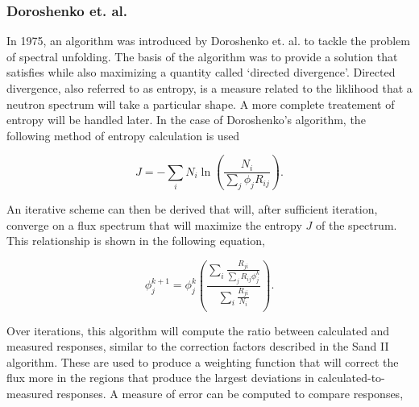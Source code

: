 \subsubsection{Doroshenko et. al.}

In 1975, an algorithm was introduced by Doroshenko et. al. to tackle the problem of spectral unfolding.
The basis of the algorithm was to provide a solution that satisfies  while also maximizing a quantity called `directed divergence'.
Directed divergence, also referred to as entropy, is a measure related to the liklihood that a neutron spectrum will take a particular shape.
A more complete treatement of entropy will be handled later.
In the case of Doroshenko's algorithm, the following method of entropy calculation is used

\begin{equation}\label{eqn:doroshenko-entropy}
J = - \sum_i N_i \ln(\frac{N_i}{\sum_j \phi_j R_{ij}}) .
\end{equation}

An iterative scheme can then be derived that will, after sufficient iteration, converge on a flux spectrum that will maximize the entropy $J$ of the spectrum.
This relationship is shown in the following equation,

\begin{equation}\label{eqn:doroshenko}
\phi_j^{k + 1} = \phi_j^{k} (\frac{\sum_i \frac{R_{ji}}{\sum_j R_{ij} \phi_j^k}}{\sum_i \frac{R_{ji}}{N_i}}) .
\end{equation}

Over iterations, this algorithm will compute the ratio between calculated and measured responses, similar to the correction factors described in the Sand II algorithm.
These are used to produce a weighting function that will correct the flux more in the regions that produce the largest deviations in calculated-to-measured responses.
A measure of error can be computed to compare responses,

